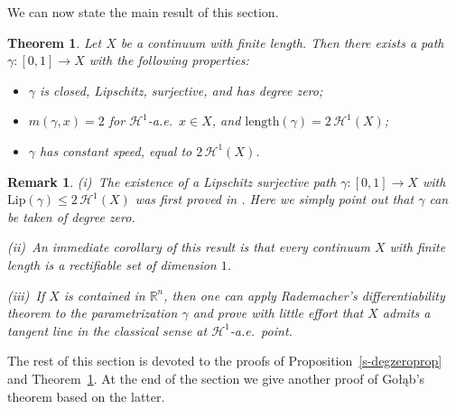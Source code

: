 \documentclass[11pt,reqno,a4paper,final]{amsart}
\numberwithin{equation}{section}
\theoremstyle{mytheorem}
\newtheorem{theorem}[subsection]{Theorem}
\theoremstyle{myremark}
\newtheorem{remark}[subsection]{Remark}
\theoremstyle{myparagraph}
\newenvironment{itemizeb}
{\begin{itemize}\itemsep=2pt\leftskip -5 pt}
{\end{itemize}}
\newcommand{\R}{\mathbb{R}}
\newcommand{\Haus}{\mathscr{H}}
\newcommand{\Golab}{Go{\l}\k{a}b}
\newcommand{\Len}{\mathrm{length}}
\newcommand{\Lip}{\mathrm{Lip}}
\begin{document}
We can now state the main result of this section.

\begin{theorem}
\label{s-canopara}
Let $X$ be a continuum with finite length. 
Then there exists a path $\gamma: [0,1]\to X$ with the following properties:
%
\begin{itemizeb}
\item[(i)]
$\gamma$ is closed, Lipschitz, surjective, and has degree zero;
\item[(ii)]
$m(\gamma,x)=2$ for $\Haus^1$-a.e.~$x\in X$, and $\Len(\gamma)=2\,\Haus^1(X)$;
\item[(iii)]
$\gamma$ has constant speed, equal to $2\,\Haus^1(X)$.
\end{itemizeb}
%
\end{theorem}


\begin{remark}
\label{s-canopararem}
(i)~The existence of a Lipschitz surjective path $\gamma:[0,1]\to X$ with 
$\Lip(\gamma) \le 2\,\Haus^1(X)$ was first proved in \cite{Wa}.
Here we simply point out 
that $\gamma$ can be taken of degree zero.

\smallskip
(ii)~An immediate corollary of this result is that 
every continuum $X$ with finite length is a rectifiable
set of dimension $1$. 

\smallskip
(iii)~If $X$ is contained in $\R^n$, then one can apply 
Rademacher's differentiability theorem to the parametrization
$\gamma$ and prove with little effort that $X$ admits a tangent
line in the classical sense at $\Haus^1$-a.e.~point.
%
\end{remark}

\bigskip
The rest of this section is devoted to the proofs of
Proposition~\ref{s-degzeroprop} and Theorem~\ref{s-canopara}. 
At the end of the section we give
another proof of \Golab's theorem based on the latter.
\end{document}
